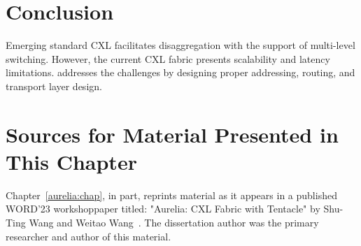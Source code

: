 
%


\section{Conclusion}
\label{aurelia:sec:conclusion}
%
Emerging standard CXL facilitates disaggregation with the support of multi-level switching. 
%
However, the current CXL fabric presents scalability and latency limitations. \aurelia addresses the challenges by designing proper addressing, routing, and transport layer design.

\section{Sources for Material Presented in This Chapter}
Chapter~\ref{aurelia:chap}, in part, reprints material as it appears in a published WORD'23 workshoppaper titled: 
"Aurelia: CXL Fabric with Tentacle" by Shu-Ting Wang and Weitao Wang~\cite{aurelia:words:2023}. 
%
The dissertation author was the primary researcher and author of this material.